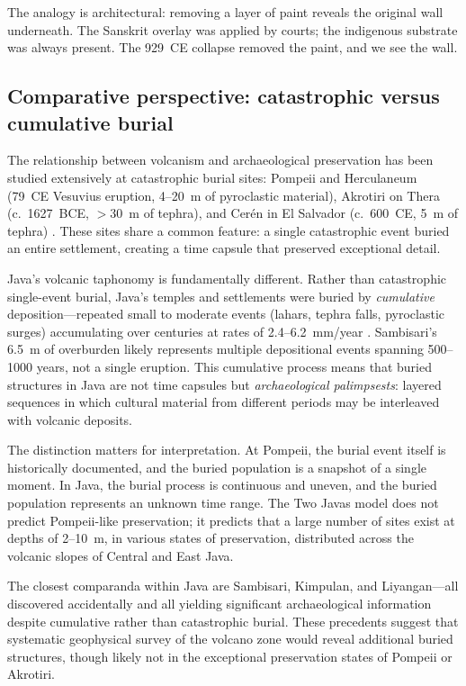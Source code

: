 \documentclass[12pt]{article}
\begin{document}
The analogy is architectural: removing a layer of paint reveals the original wall underneath.
The Sanskrit overlay was applied by courts; the indigenous substrate was always present.
The 929~CE collapse removed the paint, and we see the wall.

\subsection{Comparative perspective: catastrophic versus cumulative burial}

The relationship between volcanism and archaeological preservation has been studied extensively at catastrophic burial sites: Pompeii and Herculaneum (79~CE Vesuvius eruption, 4--20~m of pyroclastic material), Akrotiri on Thera (c.~1627~BCE, $>$30~m of tephra), and Cer\'{e}n in El Salvador (c.~600~CE, 5~m of tephra) \citep{Doumas1983, Sheets2002}.
These sites share a common feature: a single catastrophic event buried an entire settlement, creating a time capsule that preserved exceptional detail.

Java's volcanic taphonomy is fundamentally different.
Rather than catastrophic single-event burial, Java's temples and settlements were buried by \emph{cumulative} deposition---repeated small to moderate events (lahars, tephra falls, pyroclastic surges) accumulating over centuries at rates of 2.4--6.2~mm/year \citep{Lavigne2000}.
Sambisari's 6.5~m of overburden likely represents multiple depositional events spanning 500--1000 years, not a single eruption.
This cumulative process means that buried structures in Java are not time capsules but \emph{archaeological palimpsests}: layered sequences in which cultural material from different periods may be interleaved with volcanic deposits.

The distinction matters for interpretation.
At Pompeii, the burial event itself is historically documented, and the buried population is a snapshot of a single moment.
In Java, the burial process is continuous and uneven, and the buried population represents an unknown time range.
The Two Javas model does not predict Pompeii-like preservation; it predicts that a large number of sites exist at depths of 2--10~m, in various states of preservation, distributed across the volcanic slopes of Central and East Java.

The closest comparanda within Java are Sambisari, Kimpulan, and Liyangan---all discovered accidentally and all yielding significant archaeological information despite cumulative rather than catastrophic burial.
These precedents suggest that systematic geophysical survey of the volcano zone would reveal additional buried structures, though likely not in the exceptional preservation states of Pompeii or Akrotiri.
\end{document}
